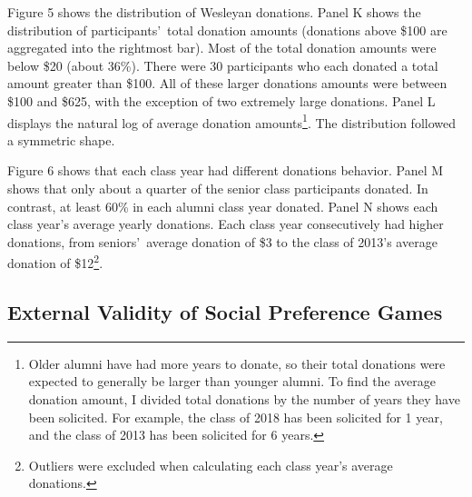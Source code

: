 \documentclass[12pt]{article}
\begin{document}
Figure 5 shows the distribution of Wesleyan donations. Panel K shows the distribution of participants\rq \ total donation amounts (donations above \$100 are aggregated into the rightmost bar). Most of the total donation amounts were below \$20 (about 36\%). There were 30 participants who each donated a total amount greater than \$100. All of these larger donations amounts were between \$100 and \$625, with the exception of two extremely large donations. Panel L displays the natural log of average donation amounts\footnote{Older alumni have had more years to donate, so their total donations were expected to generally be larger than younger alumni. To find the average donation amount, I divided total donations by the number of years they have been solicited. For example, the class of 2018 has been solicited for 1 year, and the class of 2013 has been solicited for 6 years.}. The distribution followed a symmetric shape.

Figure 6 shows that each class year had different donations behavior. Panel M shows that only about a quarter of the senior class participants donated. In contrast, at least 60\% in each alumni class year donated. Panel N shows each class year\rq s average yearly donations. Each class year consecutively had higher donations, from seniors\rq \ average donation of \$3 to the class of 2013\rq s average donation of \$12\footnote{Outliers were excluded when calculating each class year\rq s average donations.}.


\subsection{External Validity of Social Preference Games}
\end{document}
